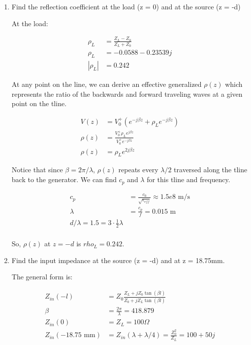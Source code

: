 \documentclass[11pt]{article}
\begin{document}
\begin{enumerate}
	\item Find the reflection coefficient at the load (z = 0) and at the source (z = -d)
	
	At the load:
	
	\begin{align*}
		\rho_L &= \frac{Z_L - Z_0}{Z_L + Z_0} \\
		\rho_L &= -0.0588 - 0.23539j \\
		|\rho_L| &= 0.242
	\end{align*}
	
	At any point on the line, we can derive an effective generalized $\rho(z)$ which represents the ratio of the backwards and forward traveling waves at a given point on the tline.
	
	\begin{align*}
		V(z) &= V_0^+ (e^{-j \beta z} + \rho_L e^{-j \beta z}) \\
		\rho(z) &= \frac{V_0^+ \rho_L e^{j \beta z}}{V_0^+ e^{-j \beta z}} \\
		\rho(z) &= \rho_L e^{2j \beta z}
	\end{align*}
	
	Notice that since $\beta = 2\pi / \lambda$, $\rho(z)$ repeats every $\lambda / 2$ traversed along the tline back to the generator. We can find $c_p$ and $\lambda$ for this tline and frequency.
	
	\begin{align*}
		c_p &= \frac{c_0}{\sqrt{\epsilon_{eff}}} \approx 1.5e8 \text{ m/s} \\
		\lambda &= \frac{c_p}{f} = 0.015 \text{ m} \\
		d / \lambda = 1.5 = 3 \cdot \frac{1}{2} \lambda \\
	\end{align*}
	
	So, $\rho(z)$ at $z = -d$ is $rho_L = 0.242$.
	
	\item Find the input impedance at the source (z = -d) and at z = 18.75mm.
	
	The general form is:
	
	\begin{align*}
		Z_{in}(-l) &= Z_0 \frac{Z_L + j Z_0 \tan(\beta l)}{Z_0 + j Z_L \tan(\beta l)} \\
		\beta &= \frac{2 \pi}{\lambda} = 418.879 \\
		Z_{in}(0) &= Z_L = 100 \Omega \\
		Z_{in}(-18.75 \text{ mm}) &= Z_{in}(\lambda + \lambda / 4) = \frac{Z_0^2}{Z_L} = 100 + 50j \\
	\end{align*}
	

\end{enumerate}
\end{document}

